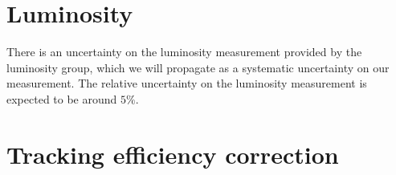 \begin{table}
  \caption{%
    Relative uncertainty on the \PDzero cross-section, in \PDzero \pTy\ bins, 
    due to the finite size of the \ac{PID} calibration sample.
  }
  \label{tab:syst:pid:stat:DzToKpi}
  \centering
\end{table}

\begin{table}
  \caption{%
    Relative uncertainty on the \PDzero cross-section, in \PDzero \pTy\ bins, 
    due to the choice of \ac{PID} calibration binning.
  }
  \label{tab:syst:pid:binning:DzToKpi}
  \centering
\end{table}


\section{Luminosity}
\label{chap:prod:syst:lumi}

There is an uncertainty on the luminosity measurement provided by the 
luminosity group, which we will propagate as a systematic uncertainty on our 
measurement.
The relative uncertainty on the luminosity measurement is expected to be around 
$5\%$.

\section{Tracking efficiency correction}
\label{chap:prod:syst:tracking}

